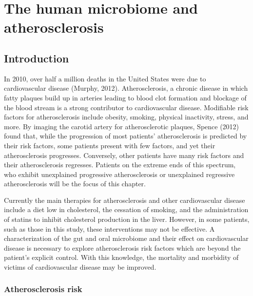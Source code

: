 \chapter{The human microbiome and atherosclerosis}
\section{Introduction}
In 2010, over half a million deaths in the United States were due to cardiovascular disease (Murphy, 2012). Atherosclerosis, a chronic disease in which fatty plaques build up in arteries leading to blood clot formation and blockage of the blood stream is a strong contributor to cardiovascular disease. Modifiable risk factors for atherosclerosis include obesity, smoking, physical inactivity, stress, and more. By imaging the carotid artery for atherosclerotic plaques, Spence (2012) found that, while the progression of most patients’ atherosclerosis is predicted by their risk factors, some patients present with few factors, and yet their atherosclerosis progresses. Conversely, other patients have many risk factors and their atherosclerosis regresses. Patients on the extreme ends of this spectrum, who exhibit unexplained progressive atherosclerosis or unexplained regressive atherosclerosis will be the focus of this chapter.

Currently the main therapies for atherosclerosis and other cardiovascular disease include a diet low in cholesterol, the cessation of smoking, and the administration of statins to inhibit cholesterol production in the liver. However, in some patients, such as those in this study, these interventions may not be effective. A characterization of the gut and oral microbiome and their effect on cardiovascular disease is necessary to explore atherosclerosis risk factors which are beyond the patient’s explicit control. With this knowledge, the mortality and morbidity of victims of cardiovascular disease may be improved.

\subsection{Atherosclerosis risk}

